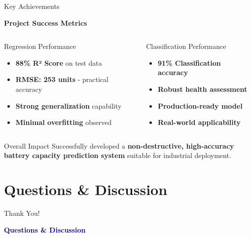 \documentclass[aspectratio=169]{beamer}
\begin{document}
\begin{frame}{Key Achievements}
\begin{center}
\Large \textbf{Project Success Metrics}
\end{center}

\vspace{0.5cm}
\begin{columns}
\begin{column}{0.5\textwidth}
\begin{block}{Regression Performance}
\begin{itemize}
\item[\checkmark] \textbf{88\% R² Score} on test data
\item[\checkmark] \textbf{RMSE: 253 units} - practical accuracy
\item[\checkmark] \textbf{Strong generalization} capability
\item[\checkmark] \textbf{Minimal overfitting} observed
\end{itemize}
\end{block}
\end{column}
\begin{column}{0.5\textwidth}
\begin{block}{Classification Performance}
\begin{itemize}
\item[\checkmark] \textbf{91\% Classification accuracy}
\item[\checkmark] \textbf{Robust health assessment}
\item[\checkmark] \textbf{Production-ready model}
\item[\checkmark] \textbf{Real-world applicability}
\end{itemize}
\end{block}
\end{column}
\end{columns}

\vspace{0.5cm}
\begin{alertblock}{Overall Impact}
Successfully developed a \textbf{non-destructive, high-accuracy battery capacity prediction system} suitable for industrial deployment.
\end{alertblock}
\end{frame}



\section{Questions \& Discussion}

\begin{frame}{Thank You!}

\vspace{1cm}
\begin{center}
\Large \textcolor{darkblue}{\textbf{Questions \& Discussion}}
\end{center}
\end{frame}
\end{document}
